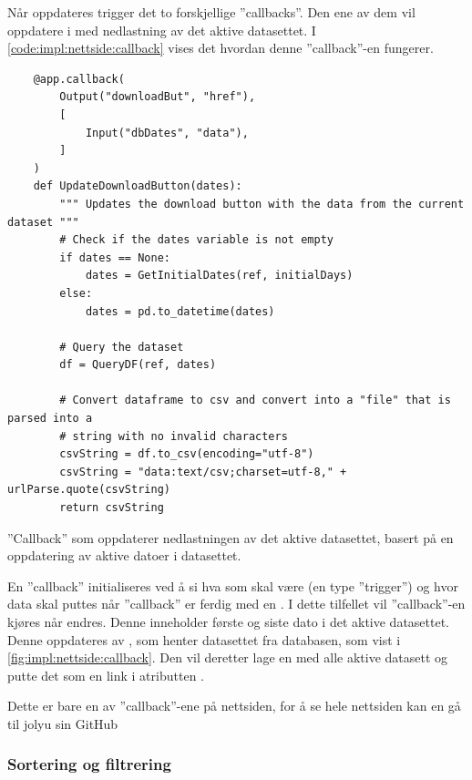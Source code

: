 Når  oppdateres trigger det to forskjellige ''callbacks''. 
Den ene av dem vil oppdatere  i  med nedlastning av det aktive datasettet. 
I \autoref{code:impl:nettside:callback} vises det hvordan denne ''callback''-en fungerer. 

\begin{listing}[!htb]
\begin{verbatim}
    @app.callback(
        Output("downloadBut", "href"),
        [
            Input("dbDates", "data"),
        ]
    )
    def UpdateDownloadButton(dates):
        """ Updates the download button with the data from the current dataset """
        # Check if the dates variable is not empty
        if dates == None:
            dates = GetInitialDates(ref, initialDays)
        else:
            dates = pd.to_datetime(dates)
        
        # Query the dataset
        df = QueryDF(ref, dates)
    
        # Convert dataframe to csv and convert into a "file" that is parsed into a 
        # string with no invalid characters
        csvString = df.to_csv(encoding="utf-8")
        csvString = "data:text/csv;charset=utf-8," + urlParse.quote(csvString)
        return csvString
\end{verbatim}
\caption{''Callback'' som oppdaterer nedlastningen av det aktive datasettet, basert på en oppdatering av aktive datoer i datasettet.}
\label{code:impl:nettside:callback}
\end{listing}

En ''callback'' initialiseres ved å si hva som skal være  (en type ''trigger'') og hvor data skal puttes når ''callback'' er ferdig med en . 
I dette tilfellet vil ''callback''-en kjøres når  endres. 
Denne inneholder første og siste dato i det aktive datasettet. 
Denne oppdateres av , som henter datasettet fra databasen, som vist i \autoref{fig:impl:nettside:callback}. 
Den vil deretter lage en  med alle aktive datasett og putte det som en link i atributten .

Dette er bare en av ''callback''-ene på nettsiden, for å se hele nettsiden kan en gå til jolyu sin GitHub \cite{GitHub}

\subsubsection{Sortering og filtrering}\label{sec:impl:nettside:sortering}

